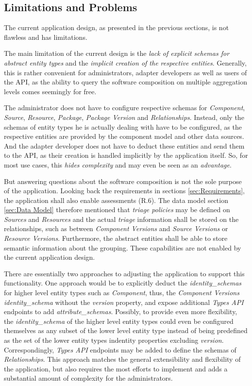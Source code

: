 \subsection{Limitations and Problems} \label{sec:Limitations and Problems}
The current application design, as presented in the previous sections, is not flawless and has limitations.\par 
The main limitation of the current design is the \emph{lack of explicit schemas for abstract entity types} and the \emph{implicit creation of the respective entities}. Generally, this is rather convenient for administrators, adapter developers as well as users of the API, as the ability to query the software composition on multiple aggregation levels comes seemingly for free.\par
The administrator does not have to configure respective schemas for \emph{Component}, \emph{Source}, \emph{Resource}, \emph{Package}, \emph{Package Version} and \emph{Relationships}. Instead, only the schemas of entity types he is actually dealing with have to be configured, as the respective entities are provided by the component model and other data sources. And the adapter developer does not have to deduct these entities and send them to the API, as their creation is handled implicitly by the application itself. So, for most use cases, this \emph{hides complexity} and may even be seen as an \emph{advantage}.\par
But answering questions about the software composition is not the sole purpose of the application. Looking back the requirements in sections \ref{sec:Requirements}, the application shall also enable assessments (R.6). The data model section \ref{sec:Data Model} therefore mentioned that \emph{triage policies} may be defined on \emph{Sources} and \emph{Resources} and the actual \emph{triage} information shall be stored on the relationships, such as between \emph{Component Versions} and \emph{Source Versions} or \emph{Resource Versions}. Furthermore, the abstract entities shall be able to store semantic information about the grouping. These capabilities are not enabled by the current application design.\par
There are essentially two approaches to adjusting the application to support this functionality. One approach would be to explicitly deduct the \emph{identity\_schemas} for higher level entity types such as \emph{Component}, thus, the \emph{Component Versions} \emph{identity\_schema} without the \emph{version} property, and expose additional \emph{Types API} endpoints to add \emph{attribute\_schemas}. Possibly, to provide even more flexibility, the \emph{identity\_schema} of the higher level entity types could even be configured themselves as any subset of the lower level entity type instead of being predefined as the set of the lower entity types indentity properties excluding \emph{version}. Correspondingly, \emph{Types API} endpoints may be added to define the schemas of \emph{Relationships}. This approach matches the general extensibility and flexibility of the application, but also requires the most efforts to implement and adds a substantial amount of complexity for the administrators.\par
